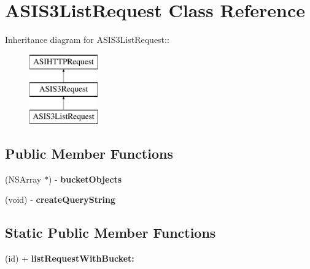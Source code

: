 \hypertarget{interface_a_s_i_s3_list_request}{
\section{ASIS3ListRequest Class Reference}
\label{interface_a_s_i_s3_list_request}
}
Inheritance diagram for ASIS3ListRequest::\begin{figure}[H]
\begin{center}
\leavevmode
\includegraphics[height=3cm]{interface_a_s_i_s3_list_request}
\end{center}
\end{figure}
\subsection*{Public Member Functions}
\begin{DoxyCompactItemize}
\item 
\hypertarget{interface_a_s_i_s3_list_request_af3025012615703036e23f67b3412bab2}{
(NSArray $\ast$) -\/ {\bfseries bucketObjects}}
\label{interface_a_s_i_s3_list_request_af3025012615703036e23f67b3412bab2}

\item 
\hypertarget{interface_a_s_i_s3_list_request_a41eb50d53bb6f4dfd46bec679a24a4c2}{
(void) -\/ {\bfseries createQueryString}}
\label{interface_a_s_i_s3_list_request_a41eb50d53bb6f4dfd46bec679a24a4c2}

\end{DoxyCompactItemize}
\subsection*{Static Public Member Functions}
\begin{DoxyCompactItemize}
\item 
\hypertarget{interface_a_s_i_s3_list_request_a628cbaaaf5f76e7ccbdbc3c7e0e25e22}{
(id) + {\bfseries listRequestWithBucket:}}
\label{interface_a_s_i_s3_list_request_a628cbaaaf5f76e7ccbdbc3c7e0e25e22}

\end{DoxyCompactItemize}
